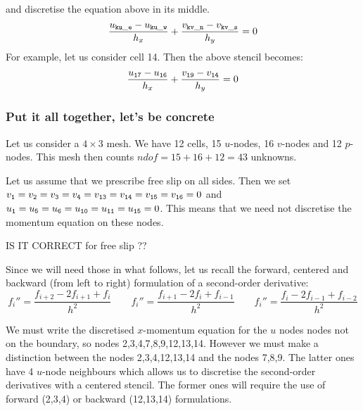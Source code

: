 


and discretise the equation above in its middle.
\[
\frac{u_{\tt ku\_e}-u_{\tt ku\_w}}{h_x} 
+
\frac{v_{\tt kv\_n}-v_{\tt kv\_s}}{h_y} 
=0
\]
For example, let us consider cell 14. Then the above stencil becomes:
\[
\frac{u_{\tt 17}-u_{\tt 16}}{h_x} + \frac{v_{\tt 19}-v_{\tt 14}}{h_y} =0
\]





\subsubsection{Put it all together, let's be concrete}

Let us consider a $4\times 3$ mesh.
We have 12 cells, 15 $u$-nodes, 16 $v$-nodes and 12 $p$-nodes.
This mesh then counts $ndof=15+16+12=43$ unknowns.






Let us assume that we prescribe free slip on all sides.
Then we set $v_{\tt 1}=v_{\tt 2}=v_{\tt 3}=v_{\tt 4}=v_{\tt 13}=v_{\tt 14}=v_{\tt 15}=v_{\tt 16}=0$
and $u_{\tt 1}=u_{\tt 5}=u_{\tt 6}=u_{\tt 10}=u_{\tt 11} = u_{\tt 15}=0$.
This means that we need not discretise the momentum equation on these nodes.

IS IT CORRECT for free slip ??

Since we will need those in what follows, let us recall the forward, centered 
and backward (from left to right) formulation of a second-order derivative:
\[
f_i''=\frac{f_{i+2}-2f_{i+1}+f_i}{h^2}
\qquad
f_i''=\frac{f_{i+1}-2f_{i}+f_{i-1}}{h^2}
\qquad
f_i''=\frac{f_{i}-2f_{i-1}+f_{i-2}}{h^2}
\]

We must write the discretised $x$-momentum equation for the $u$ nodes nodes not on the 
boundary, so nodes 2,3,4,7,8,9,12,13,14.
However we must make a distinction between the nodes 2,3,4,12,13,14 and the nodes 7,8,9.
The latter ones have 4 $u$-node neighbours which allows us to discretise the 
second-order derivatives with a 
centered stencil. The former ones will require the use of forward (2,3,4) or backward (12,13,14) formulations.

